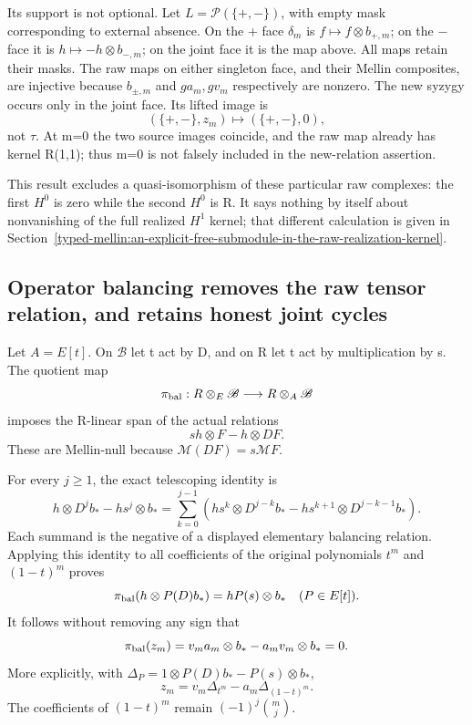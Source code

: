 Its support is not optional. Let \(L=\mathcal P(\{+,-\})\), with empty mask corresponding to external absence. On the + face \(\delta_m\) is \(f\mapsto f\otimes b_{+,m}\); on the \(-\) face it is \(h\mapsto-h\otimes b_{-,m}\); on the joint face it is the map above. All maps retain their masks. The raw maps on either singleton face, and their Mellin composites, are injective because \(b_{\pm,m}\) and \(ga_m,gv_m\) respectively are nonzero. The new syzygy occurs only in the joint face. Its lifted image is \[
(\{+,-\},z_m)\longmapsto(\{+,-\},0),
\] not \(\tau\). At m=0 the two source images coincide, and the raw map already has kernel R(1,1); thus m=0 is not falsely included in the new-relation assertion.

This result excludes a quasi-isomorphism of these particular raw complexes: the first \(H^0\) is zero while the second \(H^0\) is R. It says nothing by itself about nonvanishing of the full realized \(H^1\) kernel; that different calculation is given in Section~\ref{typed-mellin:an-explicit-free-submodule-in-the-raw-realization-kernel}.

\subsection{Operator balancing removes the raw tensor relation, and retains honest joint cycles}\label{typed-mellin:operator-balancing-removes-the-raw-tensor-relation-and-retains-honest-joint-cycles}

Let \(A=E[t]\). On \(\mathscr B\) let t act by D, and on R let t act by multiplication by s. The quotient map \[
\pi_{\rm bal}:R\otimes_E\mathscr B\longrightarrow R\otimes_A\mathscr B
\] imposes the R-linear span of the actual relations \[
sh\otimes F-h\otimes DF.
\] These are Mellin-null because \(\mathcal M(DF)=s\mathcal MF\).

For every \(j\ge1\), the exact telescoping identity is \[
h\otimes D^j b_*-hs^j\otimes b_*
=\sum_{k=0}^{j-1}
\left(hs^k\otimes D^{j-k}b_*
      -hs^{k+1}\otimes D^{j-k-1}b_*\right).
\] Each summand is the negative of a displayed elementary balancing relation. Applying this identity to all coefficients of the original polynomials \(t^m\) and \((1-t)^m\) proves \[
\pi_{\rm bal}(h\otimes P(D)b_*)=hP(s)\otimes b_*
\quad(P\in E[t]).
\] It follows without removing any sign that \[
\pi_{\rm bal}(z_m)
=v_ma_m\otimes b_*-a_mv_m\otimes b_*=0.
\] More explicitly, with \(\Delta_P=1\otimes P(D)b_*-P(s)\otimes b_*\), \[
z_m=v_m\Delta_{t^m}-a_m\Delta_{(1-t)^m}.
\] The coefficients of \((1-t)^m\) remain \((-1)^j\binom mj\).


